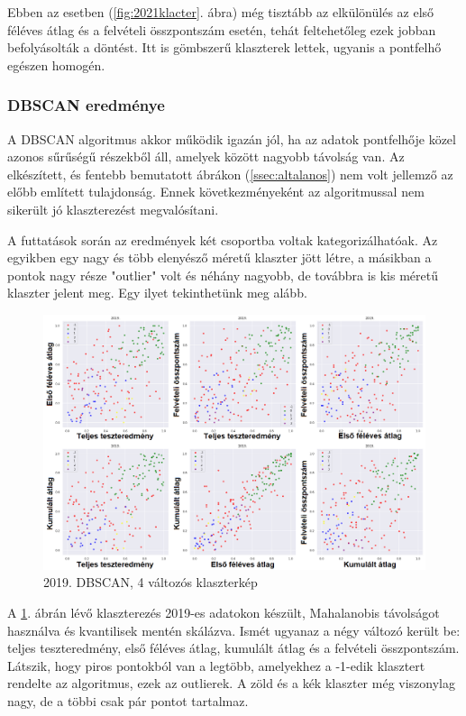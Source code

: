 \documentclass[12pt]{article}
\begin{document}
Ebben az esetben (\ref{fig:2021klacter}. ábra) még tisztább az elkülönülés az első féléves átlag és a felvételi összpontszám esetén, tehát feltehetőleg ezek jobban befolyásolták a döntést. Itt is gömbszerű klaszterek lettek, ugyanis a pontfelhő egészen homogén.

\subsubsection{DBSCAN eredménye}

A DBSCAN algoritmus akkor működik igazán jól, ha az adatok pontfelhője közel azonos sűrűségű részekből áll, amelyek között nagyobb távolság van. Az elkészített, és fentebb bemutatott ábrákon (\ref{ssec:altalanos}) nem volt jellemző az előbb említett tulajdonság. Ennek következményeként az algoritmussal nem sikerült jó klaszterezést megvalósítani.

A futtatások során az eredmények két csoportba voltak kategorizálhatóak. Az egyikben egy nagy és több elenyésző méretű klaszter jött létre, a másikban a pontok nagy része "outlier" volt és néhány nagyobb, de továbbra is kis méretű klaszter jelent meg. Egy ilyet tekinthetünk meg alább.

\begin{figure}[H]
\centering
\includegraphics[width = \textwidth]{kepek/dbscan2.png}
\caption{2019. DBSCAN, 4 változós klaszterkép}
\label{fig:dbscan2}
\end{figure}

A \ref{fig:dbscan2}. ábrán lévő klaszterezés 2019-es adatokon készült, Mahalanobis távolságot használva és kvantilisek mentén skálázva. Ismét ugyanaz a négy változó került be: teljes teszteredmény, első féléves átlag, kumulált átlag és a felvételi összpontszám. Látszik, hogy piros pontokból van a legtöbb, amelyekhez a -1-edik klasztert rendelte az algoritmus, ezek az outlierek. A zöld és a kék klaszter még viszonylag nagy, de a többi csak pár pontot tartalmaz.
\end{document}
